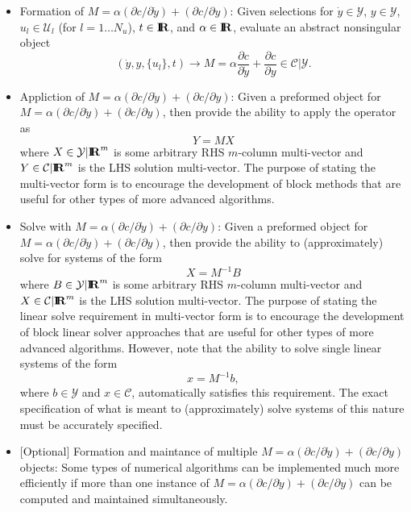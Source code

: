 \documentclass[pdf,ps2pdf,11pt]{SANDreport}
\begin{document}
\begin{itemize}
\begin{itemize}
%
{}\item Formation of $M = {}\alpha ({}\partial c / {}\partial {}\dot{y}) +
({}\partial c / {}\partial y)$: Given selections for $\dot{y}\in\mathcal{Y}$,
$y\in\mathcal{Y}$, $u_l\in\mathcal{U}_l$ (for $l=1\ldots{}N_u$), $t\in\mbox{\textbf{I}}\hspace{-0.6ex}\mbox{\textbf{R}}$,
and $\alpha\in\mbox{\textbf{I}}\hspace{-0.6ex}\mbox{\textbf{R}}$, evaluate an abstract nonsingular object
\[
(\dot{y},y,\{u_l\},t) {}\rightarrow M
= {}\alpha \frac{\partial c}{\partial {}\dot{y}} + \frac{\partial c}{\partial y}
{}\in {}\mathcal{C}|\mathcal{Y}.
\]
%
{}\item Appliction of $M = {}\alpha ({}\partial c / {}\partial {}\dot{y}) +
({}\partial c / {}\partial y)$: Given a preformed object for $M = {}\alpha
({}\partial c / {}\partial {}\dot{y}) + ({}\partial c / {}\partial y)$, then
provide the ability to apply the operator as
\[
Y = M X
\]
where $X\in\mathcal{Y}|\mbox{\textbf{I}}\hspace{-0.6ex}\mbox{\textbf{R}}^m$ is some arbitrary RHS $m$-column multi-vector
and $Y\in\mathcal{C}|\mbox{\textbf{I}}\hspace{-0.6ex}\mbox{\textbf{R}}^m$ is the LHS solution multi-vector.  The purpose of
stating the multi-vector form is to encourage the development of block methods
that are useful for other types of more advanced algorithms.
%
{}\item Solve with $M = {}\alpha ({}\partial c / {}\partial {}\dot{y}) +
({}\partial c / {}\partial y)$: Given a preformed object for $M = {}\alpha
({}\partial c / {}\partial {}\dot{y}) + ({}\partial c / {}\partial y)$, then
provide the ability to (approximately) solve for systems of the form
\[
X = M^{-1} B
\]
where $B\in\mathcal{Y}|\mbox{\textbf{I}}\hspace{-0.6ex}\mbox{\textbf{R}}^m$ is some arbitrary RHS $m$-column multi-vector
and $X\in\mathcal{C}|\mbox{\textbf{I}}\hspace{-0.6ex}\mbox{\textbf{R}}^m$ is the LHS solution multi-vector.  The purpose of
stating the linear solve requirement in multi-vector form is to encourage the
development of block linear solver approaches that are useful for other types
of more advanced algorithms.  However, note that the ability to solve single
linear systems of the form
\[
x = M^{-1} b,
\]
where $b\in\mathcal{Y}$ and $x\in\mathcal{C}$, automatically satisfies this
requirement.  The exact specification of what is meant to (approximately) solve
systems of this nature must be accurately specified.
%
{}\item{} [Optional] Formation and maintance of multiple $M = {}\alpha
({}\partial c / {}\partial {}\dot{y}) + ({}\partial c / {}\partial y)$
objects: Some types of numerical algorithms can be implemented much more
efficiently if more than one instance of $M = {}\alpha ({}\partial c /
{}\partial {}\dot{y}) + ({}\partial c / {}\partial y)$ can be computed and
maintained simultaneously.
%
\end{itemize}

\end{itemize}
\end{document}
